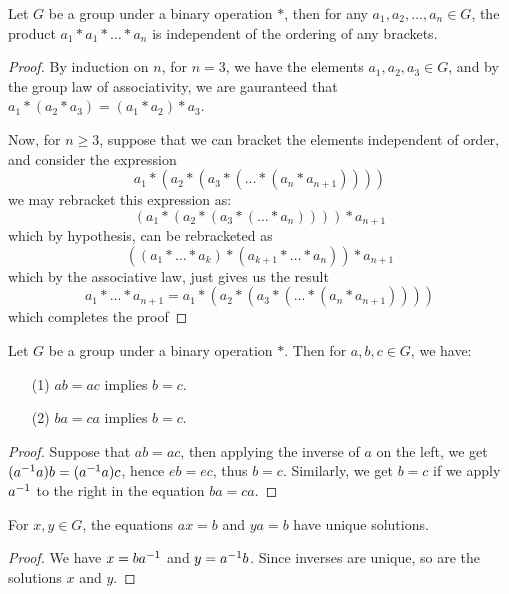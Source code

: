 \begin{theorem}\label{theorem_1.2.2}
  Let $G$ be a group under a binary operation  $\ast$, then for any  $a_1,
  a_2, \dots, a_n \in G$, the product $a_1 \ast a_1 \ast \dots \ast a_n$ is
  independent of the ordering of any brackets.
\end{theorem}
\begin{proof}
  By induction on $n$, for $n=3$, we have the elements $a_1,a_2,a_3
  \in G$, and by the group law of associativity, we are gauranteed
  that $a_1 \ast (a_2 \ast a_3)=(a_1 \ast a_2) \ast a_3$.

  Now, for $n \geq 3$, suppose that we can bracket the elements
  independent of order, and consider the expression
  \begin{equation*}
    a_1 \ast (a_2 \ast (a_3 \ast ( \dots \ast (a_n \ast a_{n+1}))))
  \end{equation*}
  we may rebracket this expression as:
  \begin{equation*}
    (a_1 \ast (a_2 \ast (a_3 \ast ( \dots \ast a_n)))) \ast a_{n+1}
  \end{equation*}
  which by hypothesis, can be rebracketed as
  \begin{equation*}
    ((a_1 \ast \dots \ast a_k) \ast (a_{k+1} \ast \dots \ast a_n)) \ast a_{n+1}
  \end{equation*}
  which by the associative law, just gives us the result
  \begin{equation*}
    a_1 \ast \dots \ast a_{n+1}=a_1 \ast (a_2 \ast (a_3 \ast ( \dots \ast (a_n \ast a_{n+1}))))
  \end{equation*}
  which completes the proof
\end{proof}

\begin{theorem}\label{theorem_1.2.3}
  Let $G$ be a group under a binary operation  $\ast$. Then for  $a,b,c \in
  G$, we have:
  \begin{enumerate}
    \item[(1)] $ab=ac$ implies  $b=c$.

    \item[(2)] $ba=ca$ implies  $b=c$.
  \end{enumerate}
\end{theorem}
\begin{proof}
  Suppose that $ab=ac$, then applying the inverse of $a$ on the left, we get
  $(a^{-1}a)b=(a^{-1}a)c$, hence $eb=ec$, thus  $b=c$. Similarly, we get
  $b=c$ if we apply  $a^{-1}$ to the right in the equation $ba=ca$.
\end{proof}
\begin{corollary}
  For $x,y \in G$, the equations  $ax=b$ and  $ya=b$ have unique solutions.
\end{corollary}
\begin{proof}
  We have $x=ba^{-1}$ and $y=a^{-1}b$. Since inverses are unique, so are the
  solutions $x$ and $y$.
\end{proof}

